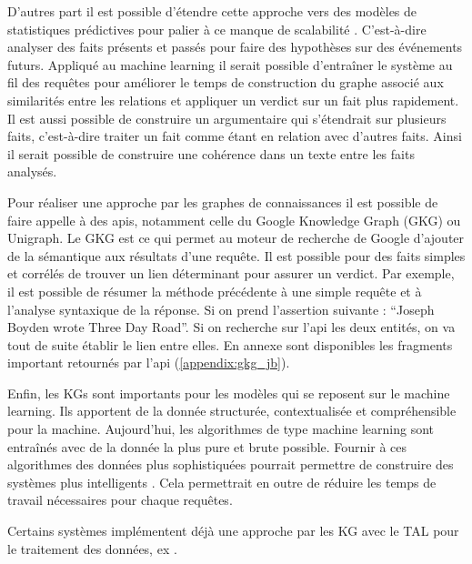 D'autres part il est possible d'étendre cette approche vers des modèles de statistiques prédictives pour palier à ce manque de scalabilité \cite{wilcke2017knowledge}. C'est-à-dire analyser des faits présents et passés pour faire des hypothèses sur des événements futurs. Appliqué au machine learning il serait possible d'entraîner le système au fil des requêtes pour améliorer le temps de construction du graphe associé aux similarités entre les relations et appliquer un verdict sur un fait plus rapidement. Il est aussi possible de construire un argumentaire qui s'étendrait sur plusieurs faits, c'est-à-dire traiter un fait comme étant en relation avec d'autres faits. Ainsi il serait possible de construire une cohérence dans un texte entre les faits analysés.

Pour réaliser une approche par les graphes de connaissances il est possible de faire appelle à des apis, notamment celle du Google Knowledge Graph (GKG) ou Unigraph. Le GKG est ce qui permet au moteur de recherche de Google d'ajouter de la sémantique aux résultats d'une requête. Il est possible pour des faits simples et corrélés de trouver un lien déterminant pour assurer un verdict. Par exemple, il est possible de résumer la méthode précédente à une simple requête et à l'analyse syntaxique de la réponse. Si on prend l'assertion suivante : \enquote{Joseph Boyden wrote Three Day Road}. Si on recherche sur l'api les deux entités, on va tout de suite établir le lien entre elles. En annexe sont disponibles les fragments important retournés par l'api (\ref{appendix:gkg_jb}). 

Enfin, les KGs sont importants pour les modèles qui se reposent sur le machine learning. Ils apportent de la donnée structurée, contextualisée et compréhensible pour la machine. Aujourd'hui, les algorithmes de type machine learning sont entraînés avec de la donnée la plus pure et brute possible. Fournir à ces algorithmes des données plus sophistiquées pourrait permettre de construire des systèmes plus intelligents \cite{nickel2016review}. Cela permettrait en outre de réduire les temps de travail nécessaires pour chaque requêtes.

Certains systèmes implémentent déjà une approche par les KG avec le TAL pour le traitement des données, ex \cite{gerber2015}. 